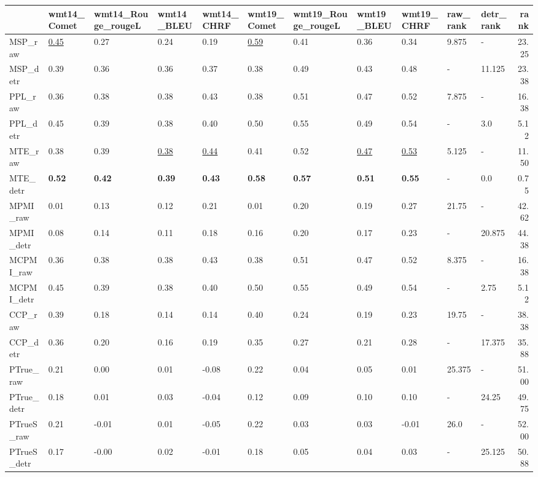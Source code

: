 \begin{tabular}{lllllllllllr}
\toprule
\midrule
 & wmt14\_Comet & wmt14\_Rouge\_rougeL & wmt14\_BLEU & wmt14\_CHRF & wmt19\_Comet & wmt19\_Rouge\_rougeL & wmt19\_BLEU & wmt19\_CHRF & raw\_rank & detr\_rank & rank \\
\midrule
\midrule
MSP\_raw & \underline{0.45} & 0.27 & 0.24 & 0.19 & \underline{0.59} & 0.41 & 0.36 & 0.34 & 9.875 & - & 23.25 \\
MSP\_detr & 0.39 & 0.36 & 0.36 & 0.37 & 0.38 & 0.49 & 0.43 & 0.48 & - & 11.125 & 23.38 \\
\midrule
PPL\_raw & 0.36 & 0.38 & 0.38 & 0.43 & 0.38 & 0.51 & 0.47 & 0.52 & 7.875 & - & 16.38 \\
PPL\_detr & 0.45 & 0.39 & 0.38 & 0.40 & 0.50 & 0.55 & 0.49 & 0.54 & - & 3.0 & 5.12 \\
\midrule
MTE\_raw & 0.38 & 0.39 & \underline{0.38} & \underline{0.44} & 0.41 & 0.52 & \underline{0.47} & \underline{0.53} & 5.125 & - & 11.50 \\
MTE\_detr & \textbf{0.52} & \textbf{0.42} & \textbf{0.39} & \textbf{0.43} & \textbf{0.58} & \textbf{0.57} & \textbf{0.51} & \textbf{0.55} & - & 0.0 & 0.75 \\
\midrule
MPMI\_raw & 0.01 & 0.13 & 0.12 & 0.21 & 0.01 & 0.20 & 0.19 & 0.27 & 21.75 & - & 42.62 \\
MPMI\_detr & 0.08 & 0.14 & 0.11 & 0.18 & 0.16 & 0.20 & 0.17 & 0.23 & - & 20.875 & 44.38 \\
\midrule
MCPMI\_raw & 0.36 & 0.38 & 0.38 & 0.43 & 0.38 & 0.51 & 0.47 & 0.52 & 8.375 & - & 16.38 \\
MCPMI\_detr & 0.45 & 0.39 & 0.38 & 0.40 & 0.50 & 0.55 & 0.49 & 0.54 & - & 2.75 & 5.12 \\
\midrule
CCP\_raw & 0.39 & 0.18 & 0.14 & 0.14 & 0.40 & 0.24 & 0.19 & 0.23 & 19.75 & - & 38.38 \\
CCP\_detr & 0.36 & 0.20 & 0.16 & 0.19 & 0.35 & 0.27 & 0.21 & 0.28 & - & 17.375 & 35.88 \\
\midrule
PTrue\_raw & 0.21 & 0.00 & 0.01 & -0.08 & 0.22 & 0.04 & 0.05 & 0.01 & 25.375 & - & 51.00 \\
PTrue\_detr & 0.18 & 0.01 & 0.03 & -0.04 & 0.12 & 0.09 & 0.10 & 0.10 & - & 24.25 & 49.75 \\
\midrule
PTrueS\_raw & 0.21 & -0.01 & 0.01 & -0.05 & 0.22 & 0.03 & 0.03 & -0.01 & 26.0 & - & 52.00 \\
PTrueS\_detr & 0.17 & -0.00 & 0.02 & -0.01 & 0.18 & 0.05 & 0.04 & 0.03 & - & 25.125 & 50.88 \\
\midrule

\end{tabular}
